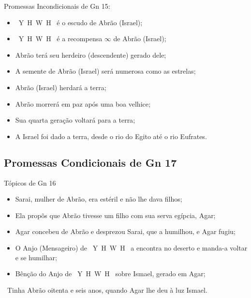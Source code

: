 \documentclass[12pt,aspectratio=169]{beamer}
\newcommand{\YA}{%
    \mbox{%
        Y\makebox[0pt][l]{\hspace{-0.178em}\raisebox{-0.00ex}{\scalebox{0.30}{E}}}%
        H\makebox[0pt][l]{\hspace{-0.010em}\raisebox{-0.00ex}{\scalebox{0.30}{O}}}%
        W\makebox[0pt][l]{\hspace{-0.245em}\raisebox{-0.00ex}{\scalebox{0.30}{A}}}%
        H%
    }%
}
\newcommand{\ver}[1]{%
    \raisebox{0.50ex}{%
        \scalebox{1.1}{%
            \pmb{\textbf{\textcolor{BSpbg}{#1}}}%
        }%
    }%
}
\newcommand{\QUOTE}[1]{%
    \par\noindent\hspace*{0.05\linewidth}%
    \begin{minipage}{0.9\linewidth}%
        \linespread{1.35}\large{#1}%
    \end{minipage}%
}
\newcommand{\YEL}[1]{{\textcolor{TXyel}{#1}}}
\newcommand{\CYA}[1]{{\textcolor{TXcya}{#1}}}
\newcommand{\BRI}[1]{{\textcolor{BSpbg}{#1}}}   %
\begin{document}
    \begin{frame}{Promessas \YEL{Incondicionais} de \BRI{Gn 15}:}
        \begin{itemize}
            \item<1-> \BRI{\YA} é o \YEL{escudo} de Abrão (Israel);
            \item<2-> \BRI{\YA} é a \YEL{recompensa} $\infty$ de Abrão (Israel);
            \item<3-> Abrão terá seu herdeiro (descendente) \YEL{gerado dele};
            \item<4-> A semente de Abrão (Israel) será \YEL{numerosa} como as \CYA{estrelas};
            \item<5-> Abrão (Israel) \YEL{herdará} a \YEL{terra};
            \item<6-> Abrão morrerá em \YEL{paz} após uma \YEL{boa velhice};
            \item<7-> Sua quarta geração \YEL{voltará} para a \YEL{terra};
            \item<8-> \YEL{A Israel foi dado a terra, desde o rio do Egito até o rio Eufrates}.
        \end{itemize}
    \end{frame}

    \subsection{Promessas \BRI{Condicionais} de Gn 17}

    \begin{frame}{Tópicos de Gn 16}
        \begin{itemize}
            \item Sarai, mulher de Abrão, era estéril e não lhe dava filhos;
            \item Ela propõs que Abrão tivesse um filho com sua serva egípcia, Agar;
            \item Agar concebeu de Abrão e desprezou Sarai, que a humilhou, e Agar fugiu;
            \item O Anjo (Mensageiro) de \YA a encontra no deserto e manda-a voltar e se
                humilhar;
            \item Bênção do Anjo de \YA sobre Ismael, gerado em Agar;
        \end{itemize}
        \QUOTE{
            \ver{16}~Tinha Abrão \YEL{oitenta e seis anos}, quando Agar lhe deu à luz Ismael.
        }
    \end{frame}
\end{document}
